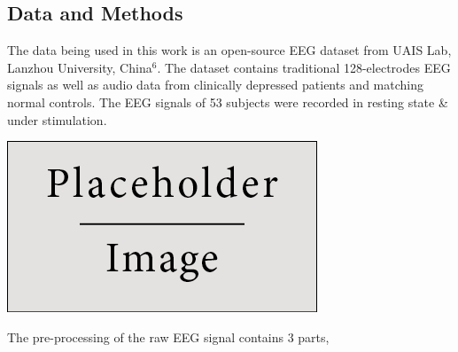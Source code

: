 \documentclass[a0,portrait]{a0poster}
\begin{document}
\begin{minipage}[c]{\linewidth}
\begin{framed}
\begin{multicols}{2}
\section*{Data and Methods}
The data being used in this work is an open-source EEG dataset from UAIS Lab, Lanzhou University, China$^6$. The dataset contains traditional 128-electrodes EEG signals as well as audio data from clinically depressed patients and matching normal controls. The EEG signals of 53 subjects were recorded in resting state \& under stimulation.  \\
\begin{center}
\includegraphics{figures/placeholder}
\label{STECchart}
\end{center}
The pre-processing of the raw EEG signal contains 3 parts, 

\end{multicols}
\end{framed}
\end{minipage}
\end{document}
